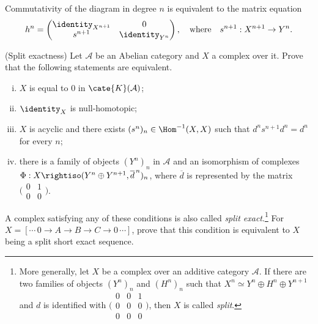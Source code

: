 \begin{Exercises}
	\begin{hint}
		Commutativity of the diagram in degree $n$ is equivalent to the matrix
		equation
		\[
			h^n=
			\begin{pmatrix}
				\identity_{X^{n+1}}&0\\
				s^{n+1}&\identity_{Y^n}
			\end{pmatrix},
			\quad\text{where}\quad
			s^{n+1}:X^{n+1}\to Y^n.
		\]
	\end{hint}

	\item (Split exactness) Let $\mathcal{A}$ be an Abelian category and $X$
	a complex over it. Prove that the following statements are equivalent.
	\begin{enumerate}[(i)]
		\item $X$ is equal to $0$ in $\cate{K}(\mathcal{A})$;
		\item $\identity_X$ is null-homotopic;
		\item $X$ is acyclic and there exists
		$(s^n)_n\in\Hom^{-1}(X,X)$ such that
		$d^ns^{n+1}d^n=d^n$ for every $n$;
		\item there is a family of objects $(Y^n)_n$ in $\mathcal{A}$ and an
		isomorphism of complexes
		$\Phi:X\rightiso(Y^n\oplus Y^{n+1},\overline d^{\,n})_n$, where
		$\overline d$ is represented by the matrix
		$\bigl(\begin{smallmatrix}0&1\\0&0\end{smallmatrix}\bigr)$.
	\end{enumerate}

	A complex satisfying any of these conditions is also called
	\emph{split exact}.\footnote{More generally, let $X$ be a complex over an
	additive category $\mathcal{A}$. If there are two families of objects
	$(Y^n)_n$ and $(H^n)_n$ such that
	$X^n\simeq Y^n\oplus H^n\oplus Y^{n+1}$ and $d$ is identified with
	$\bigl(\begin{smallmatrix}0&0&1\\0&0&0\\0&0&0\end{smallmatrix}\bigr)$,
	then $X$ is called \emph{split}.}
	For
	$X=[\cdots\,0\to A\to B\to C\to0\,\cdots]$, prove that this condition
	is equivalent to $X$ being a split short exact sequence.


\end{Exercises}
